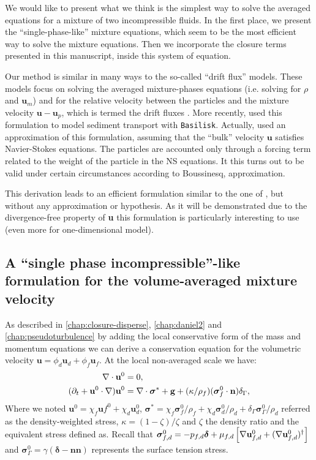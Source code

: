We would like to present what we think is the simplest way to solve the averaged equations for a mixture of two incompressible fluids.
In the first place, we present the ``single-phase-like'' mixture equations, which seem to be the most efficient way to solve the mixture equations. 
Then we incorporate the closure terms presented in this manuscript, inside this system of equation.

Our method is similar in many ways to the so-called ``drift flux'' models. 
These models focus on solving the averaged mixture-phases equations (i.e. solving for $\rho$ and $\textbf{u}_m$) and for the relative velocity between the particles and the mixture velocity $\textbf{u}- \textbf{u}_p$, which is termed the drift fluxes \citep{ishii1977one,guazzelli2011}.  
More recently,  \citet{kriaa2023two} used this formulation to model sediment transport with \texttt{Basilisk}.
Actually, \citet{kriaa2023two} used an approximation of this formulation, assuming that the ``bulk'' velocity $\textbf{u}$ satisfies Navier-Stokes equations.
The particles are accounted  only through a forcing term related to the weight of the particle in the NS equations. 
It this turns out to be valid under certain circumstances  according to Boussinesq, approximation. 

This derivation leads to an efficient formulation similar to the one of \citet{kriaa2023two}, but without any approximation or hypothesis.  
As it will be demonstrated due to the divergence-free property of \textbf{u} this formulation is particularly interesting to use (even more for one-dimensional model). 



\subsection{A ``single phase incompressible''-like formulation for the volume-averaged mixture velocity}

As described in \ref{chap:closure-disperse}, \ref{chap:daniel2} and \ref{chap:pseudoturbulence} by adding the local conservative form of the mass and momentum equations we can derive a conservation equation for the volumetric velocity $\textbf{u} =\phi_d\textbf{u}_d + \phi_f \textbf{u}_f$. 
At the local non-averaged scale we have: 
\begin{align}
    \label{eq:NSmass0}
    \div \textbf{u}^0 &= 0, \\
    (\pddt 
    + \textbf{u}^0 \cdot \grad) \textbf{u}^0
    &= 
    \div \bm\sigma^*
    +\textbf{g}
    +(\kappa/\rho_f)(\bm\sigma_f^0\cdot \textbf{n})\delta_\Gamma,
    \label{eq:NSmomentum0}
\end{align}
Where we noted $\textbf{u}^0 = \chi_f \textbf{u}f^0 + \chi_d \textbf{u}_d^0$, $\bm\sigma^* = \chi_f \bm\sigma_f^0/\rho_f  + \chi_d \bm\sigma_d^0/\rho_d + \delta_\Gamma \bm\sigma_\Gamma^0/\rho_d $ referred as the density-weighted stress, $\kappa = (1-\zeta)/\zeta$ and $\zeta$ the density ratio and the equivalent stress defined as.
Recall that $\bm\sigma_{f,d}^0 = -p_{f,d}\bm\delta + \mu_{f,d}\left[\mathbf{\nabla} \textbf{u}_{f,d}^0+ (\mathbf{\nabla} \textbf{u}_{f,d}^0)^\dagger\right]$ and $\bm\sigma_\Gamma^0 = \gamma (\bm\delta - \textbf{nn})$ represents the surface tension stress.

